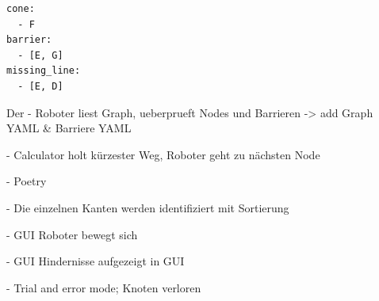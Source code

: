 \begin{verbatim}
cone:
  - F
barrier:
  - [E, G]
missing_line:
  - [E, D]
\end{verbatim}

Der 
- Roboter liest Graph, ueberprueft Nodes und Barrieren
-> add Graph YAML \& Barriere YAML

- Calculator holt kürzester Weg, Roboter geht zu nächsten Node

- Poetry

- Die einzelnen Kanten werden identifiziert mit Sortierung

- GUI Roboter bewegt sich

- GUI Hindernisse aufgezeigt in GUI

- Trial and error mode; Knoten verloren